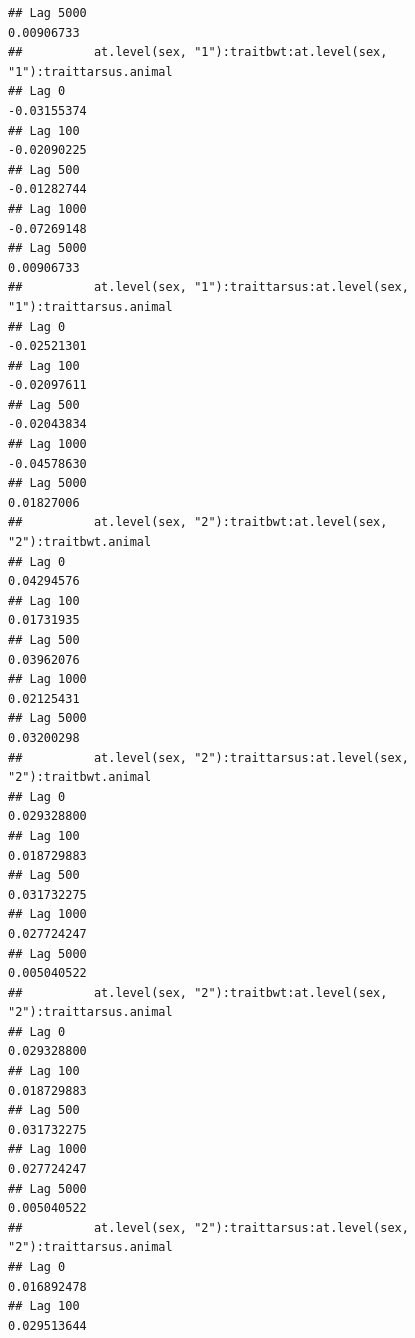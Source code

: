 \documentclass[
  12pt,
]{book}
\begin{document}
\begin{verbatim}
## Lag 5000                                                        0.00906733
##          at.level(sex, "1"):traitbwt:at.level(sex, "1"):traittarsus.animal
## Lag 0                                                          -0.03155374
## Lag 100                                                        -0.02090225
## Lag 500                                                        -0.01282744
## Lag 1000                                                       -0.07269148
## Lag 5000                                                        0.00906733
##          at.level(sex, "1"):traittarsus:at.level(sex, "1"):traittarsus.animal
## Lag 0                                                             -0.02521301
## Lag 100                                                           -0.02097611
## Lag 500                                                           -0.02043834
## Lag 1000                                                          -0.04578630
## Lag 5000                                                           0.01827006
##          at.level(sex, "2"):traitbwt:at.level(sex, "2"):traitbwt.animal
## Lag 0                                                        0.04294576
## Lag 100                                                      0.01731935
## Lag 500                                                      0.03962076
## Lag 1000                                                     0.02125431
## Lag 5000                                                     0.03200298
##          at.level(sex, "2"):traittarsus:at.level(sex, "2"):traitbwt.animal
## Lag 0                                                          0.029328800
## Lag 100                                                        0.018729883
## Lag 500                                                        0.031732275
## Lag 1000                                                       0.027724247
## Lag 5000                                                       0.005040522
##          at.level(sex, "2"):traitbwt:at.level(sex, "2"):traittarsus.animal
## Lag 0                                                          0.029328800
## Lag 100                                                        0.018729883
## Lag 500                                                        0.031732275
## Lag 1000                                                       0.027724247
## Lag 5000                                                       0.005040522
##          at.level(sex, "2"):traittarsus:at.level(sex, "2"):traittarsus.animal
## Lag 0                                                             0.016892478
## Lag 100                                                           0.029513644

\end{verbatim}
\end{document}
